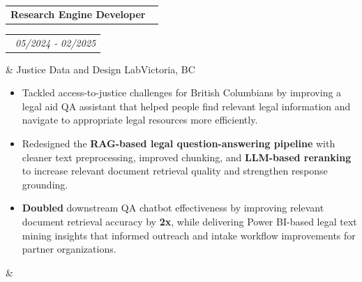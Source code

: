 \documentclass[11pt,a4paper,sans]{moderncv}
\makeatletter
\newcommand*{\customcventry}[7][.13em]{
\begin{tabular}{@{}l}
{\bfseries #4} \
{\itshape #3}
\end{tabular}
\hfill
\begin{tabular}{l@{}}
{\bfseries #5} \
{\itshape #2}
\end{tabular}
\ifx&#7&%
\else{\
\begin{minipage}{\maincolumnwidth}%
\small#7%
\end{minipage}}\fi%
\par\addvspace{#1}}
\makeatother
\begin{document}
\customcventry{05/2024 ‐ 02/2025}{}{Research Engine Developer}{}{}{
	\vspace{4pt}
	Justice Data and Design Lab\hfill{Victoria, BC}
	\vspace{2pt}
	\begin{itemize}[leftmargin=0.6cm, label={\textbullet}]
        \item Tackled access-to-justice challenges for British Columbians by improving a legal aid QA assistant that helped people find relevant legal information and navigate to appropriate legal resources more efficiently.
        \vspace{-4pt}
        \item Redesigned the \textbf{RAG-based legal question-answering pipeline} with cleaner text preprocessing, improved chunking, and \textbf{LLM-based reranking} to increase relevant document retrieval quality and strengthen response grounding.
        \vspace{-4pt}
        \item \textbf{Doubled} downstream QA chatbot effectiveness by improving relevant document retrieval accuracy by \textbf{2x}, while delivering Power BI-based legal text mining insights that informed outreach and intake workflow improvements for partner organizations.
        \vspace{-4pt}
	\end{itemize}
}

\vspace{1pt}
\end{document}
